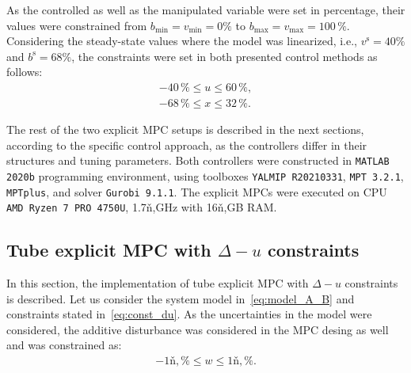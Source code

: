 \documentclass[letterpaper, 10 pt, conference]{ieeeconf}
\begin{document}
As the controlled as well as the manipulated variable were set in percentage, their values were constrained from $b_{\min} = v_{\min} = 0\%$ to $b_{\max} = v_{\max} = 100\,\%$. Considering the steady-state values where the model was linearized, i.e., $ v^\mathrm{s} = 40\%$ and $ b^\mathrm{s} = 68\%$, the constraints were set in both presented control methods as follows: 
\begin{subequations}
	\label{eq:const_u_y} 
	\begin{eqnarray}
	\label{eq:const_u}
	-40\,\% \le u \le 60\,\%, \\
	\label{eq:const_y}
	-68\,\% \le x \le 32\,\%.
	\end{eqnarray}
\end{subequations}

The rest of the two explicit MPC setups is described in the next sections, according to the specific control approach, as the controllers differ in their structures and tuning parameters. Both controllers were constructed in \texttt{MATLAB 2020b} programming environment, using toolboxes \texttt{YALMIP R20210331}, \texttt{MPT 3.2.1}, \texttt{MPTplus},
and solver \texttt{Gurobi 9.1.1}. The explicit MPCs were executed on
CPU \texttt{AMD Ryzen 7 PRO 4750U}, 1.7ň,GHz with 16ň,GB RAM.

\subsection{Tube explicit MPC with $\Delta-u$ constraints}
\label{sec:tube_exp}

In this section, the implementation of tube explicit MPC with $\Delta-u$ constraints is described. Let us consider the system model in~\eqref{eq:model_A_B} and constraints stated in~\eqref{eq:const_du}. 
As the uncertainties in the model were considered, the additive disturbance was considered in the MPC desing as well and was constrained as:
\begin{eqnarray}
	\label{eq:const_w}
	-1ň,\% \le w \le 1ň,\%.
\end{eqnarray}
\end{document}
